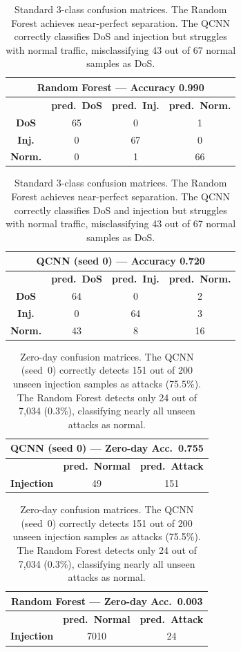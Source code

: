 \documentclass[twoside,openany,a4paper,11pt,english]{report}
\begin{document}
\begin{table}[ht]
\centering
\small
\begin{tabular}{c|ccc}
    \multicolumn{4}{c}{\textbf{Random Forest} --- Accuracy 0.990} \\
    \toprule
     & \textbf{pred.\ DoS} & \textbf{pred.\ Inj.} & \textbf{pred.\ Norm.} \\
    \midrule
    \textbf{DoS}    & 65 &  0 &  1 \\
    \textbf{Inj.}   &  0 & 67 &  0 \\
    \textbf{Norm.}   &  0 &  1 & 66 \\
    \bottomrule
\end{tabular}
\hspace{0.8cm}
\begin{tabular}{c|ccc}
    \multicolumn{4}{c}{\textbf{QCNN (seed 0)} --- Accuracy 0.720} \\
    \toprule
     & \textbf{pred.\ DoS} & \textbf{pred.\ Inj.} & \textbf{pred.\ Norm.} \\
    \midrule
    \textbf{DoS}    & 64 &  0 &  2 \\
    \textbf{Inj.}   &  0 & 64 &  3 \\
    \textbf{Norm.}   & 43 &  8 & 16 \\
    \bottomrule
\end{tabular}
\caption{Standard 3-class confusion matrices. The Random Forest achieves near-perfect separation. The QCNN correctly classifies DoS and injection but struggles with normal traffic, misclassifying 43 out of 67 normal samples as DoS.}
\label{tab:cm_std_annex}
\end{table}

\begin{table}[ht]
\centering
\small
\begin{tabular}{c|cc}
    \multicolumn{3}{c}{\textbf{QCNN (seed 0)} --- Zero-day Acc.\ 0.755} \\
    \toprule
     & \textbf{pred.\ Normal} & \textbf{pred.\ Attack} \\
    \midrule
    \textbf{Injection}  & 49 & 151 \\
    \bottomrule
\end{tabular}
\hspace{0.8cm}
\begin{tabular}{c|cc}
    \multicolumn{3}{c}{\textbf{Random Forest} --- Zero-day Acc.\ 0.003} \\
    \toprule
     & \textbf{pred.\ Normal} & \textbf{pred.\ Attack} \\
    \midrule
    \textbf{Injection}  & 7010 & 24 \\
    \bottomrule
\end{tabular}
\caption{Zero-day confusion matrices. The QCNN (seed~0) correctly detects 151 out of 200 unseen injection samples as attacks (75.5\%). The Random Forest detects only 24 out of 7,034 (0.3\%), classifying nearly all unseen attacks as normal.}
\label{tab:cm_zd_annex}
\end{table}
\end{document}
